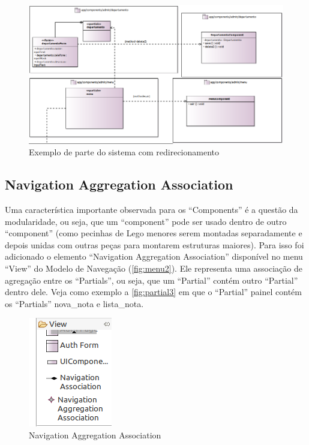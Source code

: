 \documentclass[
article,			%
11pt,				%
oneside,			%
a4paper,			%
english,			%
brazil,				%
sumario=tradicional
]{abntex2}
\begin{document}
\begin{figure}
	\centering
	\includegraphics[width=0.7\linewidth]{figuras/Partial5}
	\caption{Exemplo de parte do sistema com redirecionamento}
	\label{fig:partial5}
\end{figure}


\subsection{Navigation Aggregation Association}

Uma característica importante observada para os ``Components'' é a questão da modularidade, ou seja, que um ``component'' pode ser usado dentro de outro ``component'' (como pecinhas de Lego menores serem montadas separadamente e depois unidas com outras peças para montarem estruturas maiores). Para isso foi adicionado o elemento ``Navigation Aggregation Association'' disponível no menu ``View'' do Modelo de Navegação (\autoref{fig:menu2}). Ele representa uma associação de agregação entre os ``Partials'', ou seja, que um ``Partial'' contém outro ``Partial'' dentro dele. Veja como exemplo a \autoref{fig:partial3} em que o ``Partial'' painel contém os ``Partials'' nova\_nota e lista\_nota.

\begin{figure}
	\centering
	\includegraphics[width=0.3\linewidth]{figuras/menu2}
	\caption{Navigation Aggregation Association}
	\label{fig:menu2}
\end{figure}
\end{document}
